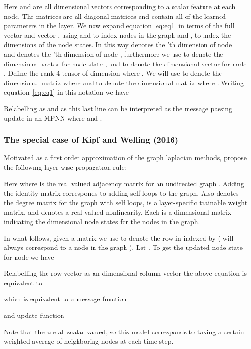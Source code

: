\documentclass{article}
\begin{document}
    
    Here  and  are all  dimensional vectors corresponding to a scalar feature at each node. The matrices  are all diagonal  matrices and contain all of the learned parameters in the layer. We now expand equation \ref{eq:eq1} in terms of the full  vector  and  vector , using  and  to index nodes in the graph  and ,  to index the dimensions of the node states. In this way  denotes the 'th dimension of node , and  denotes the 'th dimension of node , furthermore we use  to denote the  dimensional vector for node state , and  to denote the  dimensional vector for node . Define the rank 4 tensor  of dimension  where . We will use  to denote the  dimensional matrix where   and  to denote the  dimensional matrix where . Writing equation~\ref{eq:eq1} in this notation we have
    
    
    Relabelling  as  and  as  this last line can be interpreted as the message passing update in an MPNN where  and . 
    
    \subsubsection{The special case of Kipf and Welling (2016)}
    
    Motivated as a first order approximation of the graph laplacian methods, \citet{kipf2016} propose the following layer-wise propagation rule:
    
    Here  where  is the real valued adjacency matrix for an undirected graph . Adding the identity matrix  corresponds to adding self loops to the graph. Also  denotes the degree matrix for the graph with self loops,  is a layer-specific trainable weight matrix, and  denotes a real valued nonlinearity. Each  is a  dimensional matrix indicating the  dimensional node states for the  nodes in the graph. 
    
    In what follows, given a matrix  we use  to denote the row in  indexed by  ( will always correspond to a node in the graph ). Let . To get the updated node state for node  we have 
    
    Relabelling the row vector  as an  dimensional column vector  the above equation is equivalent to
    
    which is equivalent to a message function 
    
    and update function 
    
    Note that the  are all scalar valued, so this model corresponds to taking a certain weighted average of neighboring nodes at each time step. 
    
\end{document}
